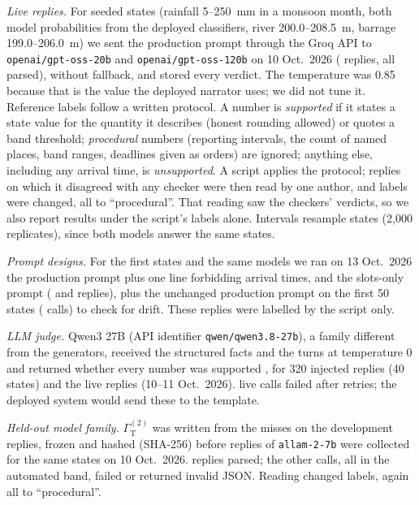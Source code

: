 \documentclass[conference]{IEEEtran}
\begin{document}
\textit{Live replies.} For \LiveStates{} seeded states (rainfall 5--250~mm in a monsoon month, both model probabilities from the deployed classifiers, river 200.0--208.5~m, barrage 199.0--206.0~m) we sent the production prompt through the Groq API to \texttt{openai/gpt-oss-20b} and \texttt{openai/gpt-oss-120b} on 10 Oct.\ 2026 (\LiveN{} replies, all parsed), without fallback, and stored every verdict. The temperature was 0.85 because that is the value the deployed narrator uses; we did not tune it. Reference labels follow a written protocol. A number is \emph{supported} if it states a state value for the quantity it describes (honest rounding allowed) or quotes a band threshold; \emph{procedural} numbers (reporting intervals, the count of named places, band ranges, deadlines given as orders) are ignored; anything else, including any arrival time, is \emph{unsupported}. A script applies the protocol; replies on which it disagreed with any checker were then read by one author, and \LiveOverrides{} labels were changed, all to ``procedural''. That reading saw the checkers' verdicts, so we also report results under the script's labels alone. Intervals resample states (2,000 replicates), since both models answer the same states.

\textit{Prompt designs.} For the first \VarStates{} states and the same models we ran on 13 Oct.\ 2026 the production prompt plus one line forbidding arrival times, and the slots-only prompt (\VarNoetaParsed{} and \VarSlotsParsed{} replies), plus the unchanged production prompt on the first 50 states (\VarBaseN{} calls) to check for drift. These replies were labelled by the script only.

\textit{LLM judge.} Qwen3 27B (API identifier \texttt{qwen/qwen3.8-27b}), a family different from the generators, received the structured facts and the turns at temperature 0 and returned whether every number was supported \cite{Zheng2023}, for 320 injected replies (40 states) and the \LiveN{} live replies (10--11 Oct.\ 2026). \JudFailN{} live calls failed after retries; the deployed system would send these to the template.

\textit{Held-out model family.} $\Gamma_{\mathrm{T}}^{(2)}$ was written from the misses on the development replies, frozen and hashed (SHA-256) before replies of \texttt{allam-2-7b} were collected for the same \HoStates{} states on 10 Oct.\ 2026. \HoN{} replies parsed; the other \HoParseFail{} calls, all in the automated band, failed or returned invalid JSON. Reading changed \HoOverrides{} labels, again all to ``procedural''.
\end{document}
